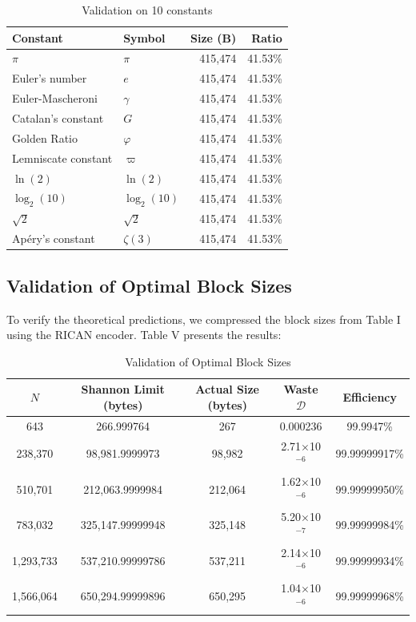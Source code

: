 \documentclass[10pt, onecolumn]{IEEEtran}
\begin{document}
\begin{table}[ht]
\centering
\caption{Validation on 10 constants}
\label{tab:constants}
\begin{tabular}{llrr}
\toprule
Constant & Symbol & Size (B) & Ratio \\
\midrule
$\pi$ & $\pi$ & 415,474 & 41.53\% \\
Euler's number & $e$ & 415,474 & 41.53\% \\
Euler-Mascheroni & $\gamma$ & 415,474 & 41.53\% \\
Catalan's constant & $G$ & 415,474 & 41.53\% \\
Golden Ratio & $\varphi$ & 415,474 & 41.53\% \\
Lemniscate constant & $\varpi$ & 415,474 & 41.53\% \\
$\ln(2)$ & $\ln(2)$ & 415,474 & 41.53\% \\
$\log_2(10)$ & $\log_2(10)$ & 415,474 & 41.53\% \\
$\sqrt{2}$ & $\sqrt{2}$ & 415,474 & 41.53\% \\
Ap\'ery's constant & $\zeta(3)$ & 415,474 & 41.53\% \\
\bottomrule
\end{tabular}
\end{table}

\subsection{Validation of Optimal Block Sizes}

To verify the theoretical predictions, we compressed the block sizes from Table I using the RICAN encoder. Table V presents the results:

\begin{table}[ht]
\centering
\caption{Validation of Optimal Block Sizes}
\label{tab:optimal_validation}
\begin{tabular}{ccccc}
\toprule
$N$ & Shannon Limit (bytes) & Actual Size (bytes) & Waste $\mathcal{D}$ & Efficiency \\
\midrule
643 & 266.999764 & 267 & 0.000236 & 99.9947\% \\
238,370 & 98,981.9999973 & 98,982 & 2.71$\times$10$^{-6}$ & 99.99999917\% \\
510,701 & 212,063.9999984 & 212,064 & 1.62$\times$10$^{-6}$ & 99.99999950\% \\
783,032 & 325,147.99999948 & 325,148 & 5.20$\times$10$^{-7}$ & 99.99999984\% \\
1,293,733 & 537,210.99999786 & 537,211 & 2.14$\times$10$^{-6}$ & 99.99999934\% \\
1,566,064 & 650,294.99999896 & 650,295 & 1.04$\times$10$^{-6}$ & 99.99999968\% \\
\bottomrule
\end{tabular}
\end{table}
\end{document}
